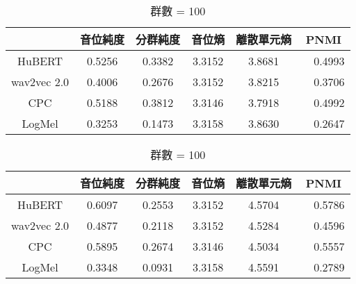         \begin{table}[!htbp]
            \centering
            \begin{subtable}[t]{\textwidth}
                \centering
                \begin{tabular}{|c|c|c|c|c|c|} \hline 
                                & 音位純度 & 分群純度 & 音位熵 & 離散單元熵 &    PNMI \\ \hline 
                    HuBERT      &   0.5256 &   0.3382 & 3.3152 &     3.8681 &　0.4993 \\ \hline    %
                    wav2vec 2.0 &   0.4006 &   0.2676 & 3.3152 &     3.8215 &　0.3706 \\ \hline    %
                    CPC         &   0.5188 &   0.3812 & 3.3146 &     3.7918 &　0.4992 \\ \hline    %
                    LogMel      &   0.3253 &   0.1473 & 3.3158 &     3.8630 &　0.2647 \\ \hline    %
                \end{tabular}
                \caption{群數 = 50}
                \label{tab:ch3-clu050}
            \end{subtable}        

            \vspace{0.5cm}        

            \begin{subtable}[t]{\textwidth}
                \centering
                \begin{tabular}{|c|c|c|c|c|c|} \hline 
                                & 音位純度 & 分群純度 & 音位熵 & 離散單元熵 &    PNMI \\ \hline 
                    HuBERT      &   0.6097 &   0.2553 & 3.3152 &     4.5704 &　0.5786 \\ \hline    %
                    wav2vec 2.0 &   0.4877 &   0.2118 & 3.3152 &     4.5284 &　0.4596 \\ \hline    %
                    CPC         &   0.5895 &   0.2674 & 3.3146 &     4.5034 &　0.5557 \\ \hline    %
                    LogMel      &   0.3348 &   0.0931 & 3.3158 &     4.5591 &　0.2789 \\ \hline    %
                \end{tabular}
                \caption{群數 = 100}
                \label{tab:ch3-clu100}
            \end{subtable}        


\end{table}
